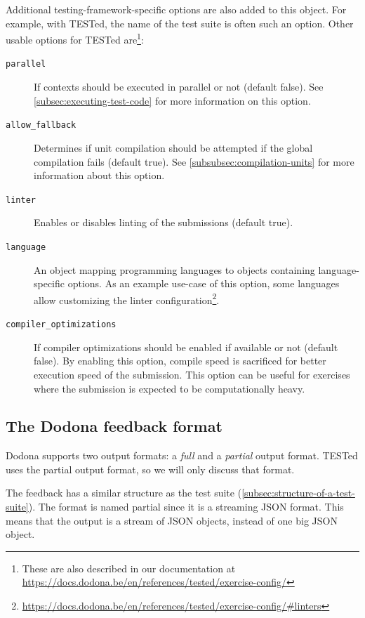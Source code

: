 \documentclass[../main]{subfiles}
\begin{document}
Additional testing-framework-specific options are also added to this object.
For example, with TESTed, the name of the test suite is often such an option.
Other usable options for TESTed are\footnote{These are also described in our documentation at \url{https://docs.dodona.be/en/references/tested/exercise-config/}}:

\begin{description}
    \item[\texttt{parallel}] If contexts should be executed in parallel or not (default false).
        See \cref{subsec:executing-test-code} for more information on this option.
    \item[\texttt{allow\_fallback}] Determines if unit compilation should be attempted if the global compilation fails (default true).
        See \cref{subsubsec:compilation-units} for more information about this option.
    \item[\texttt{linter}] Enables or disables linting of the submissions (default true).
    \item[\texttt{language}] An object mapping programming languages to objects containing language-specific options.
        As an example use-case of this option, some languages allow customizing the linter configuration\footnote{\url{https://docs.dodona.be/en/references/tested/exercise-config/\#linters}}.
    \item[\texttt{compiler\_optimizations}] If compiler optimizations should be enabled if available or not (default false).
        By enabling this option, compile speed is sacrificed for better execution speed of the submission.
        This option can be useful for exercises where the submission is expected to be computationally heavy.
\end{description}

\subsection{The Dodona feedback format}\label{subsec:dodona-output}

Dodona supports two output formats: a \emph{full} and a \emph{partial} output format.
TESTed uses the partial output format, so we will only discuss that format.

The feedback has a similar structure as the test suite (\cref{subsec:structure-of-a-test-suite}).
The format is named partial since it is a streaming JSON format.
This means that the output is a stream of JSON objects, instead of one big JSON object.
\end{document}
